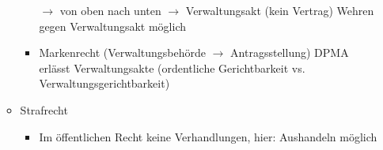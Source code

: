 \documentclass{report}
\begin{document}
\begin{itemize}
\begin{itemize}
\begin{itemize}
			\newline $\rightarrow$ von oben nach unten $\rightarrow$ Verwaltungsakt (kein Vertrag)
			\newline Wehren gegen Verwaltungsakt möglich
			\item Markenrecht (Verwaltungsbehörde $\rightarrow$ Antragsstellung)
			\newline DPMA erlässt Verwaltungsakte (ordentliche Gerichtbarkeit vs. Verwaltungsgerichtbarkeit)
		\end{itemize}
		\item Strafrecht
		\begin{itemize}
			\item Im öffentlichen Recht keine Verhandlungen, hier: Aushandeln möglich
		\end{itemize}
	\end{itemize}
\end{itemize}
\end{document}
